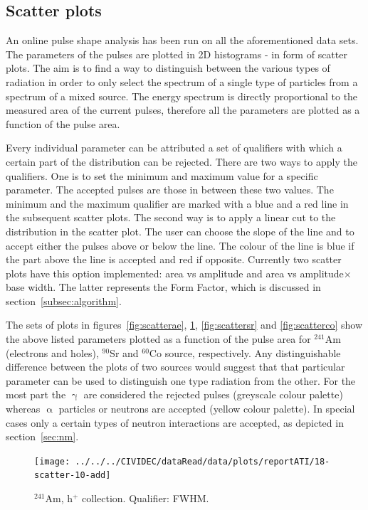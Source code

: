 \subsection{Scatter plots}
An online pulse shape analysis has been run on all the aforementioned data sets. The parameters of the pulses are plotted in 2D histograms - in form of scatter plots. The aim is to find a way to distinguish between the various types of radiation in order to only select the spectrum of a single type of particles from a spectrum of a mixed source. The energy spectrum is directly proportional to the measured area of the current pulses, therefore all the parameters are plotted as a function of the pulse area.

Every individual parameter can be attributed a set of qualifiers with which a certain part of the distribution can be rejected. There are two ways to apply the qualifiers. One is to set the minimum and maximum value for a specific parameter. The accepted pulses are those in between these two values. The minimum and the maximum qualifier are marked with a blue and a red line in the subsequent scatter plots. The second way is to apply a linear cut to the distribution in the scatter plot. The user can choose the slope of the line and to accept either the pulses above or below the line. The colour of the line is blue if the part above the line is accepted and red if opposite. Currently two scatter plots have this option implemented: area vs amplitude and area vs amplitude$\times$base width. The latter represents the Form Factor, which is discussed in section~\ref{subsec:algorithm}.

The sets of plots in figures~\ref{fig:scatterae}, \ref{fig:scatterah}, \ref{fig:scattersr} and \ref{fig:scatterco} show the above listed parameters plotted as a function of the pulse area for $^{241}$Am (electrons and holes), $^{90}$Sr and $^{60}$Co source, respectively. Any distinguishable difference between the plots of two sources would suggest that that particular parameter can be used to distinguish one type radiation from the other. For the most part the $\upgamma$ are considered the rejected pulses (greyscale colour palette) whereas $\upalpha$ particles or neutrons are accepted (yellow colour palette). In special cases only a certain types of neutron interactions are accepted, as depicted in section~\ref{sec:nm}.


 

\clearpage
\clearpage
\begin{figure}[!t]
\centering
\texttt{[image: ../../../CIVIDEC/dataRead/data/plots/reportATI/18-scatter-10-add]}
\caption{$^{241}$Am, h$^{+}$ collection. Qualifier: FWHM.}
\label{fig:scatterah}
\end{figure}

